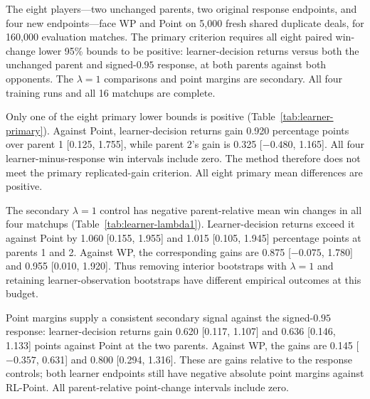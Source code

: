 \documentclass[11pt]{article}
\begin{document}
The eight players---two unchanged parents, two original response endpoints,
and four new endpoints---face WP and Point on 5,000 fresh shared duplicate
deals, for 160,000 evaluation matches. The primary criterion requires all eight
paired win-change lower 95\% bounds to be positive: learner-decision returns
versus both the unchanged parent and signed-$0.95$ response, at both parents
against both opponents. The $\lambda=1$ comparisons and point margins are
secondary. All four training runs and all 16 matchups are complete.

Only one of the eight primary lower bounds is positive
(Table~\ref{tab:learner-primary}). Against Point, learner-decision returns gain
0.920 percentage points over parent 1 [0.125, 1.755], while parent 2's gain is
0.325 [$-0.480$, 1.165]. All four learner-minus-response win intervals include
zero. The method therefore does not meet the primary replicated-gain criterion.
All eight primary mean differences are positive.

\begin{table}[ht]
\centering\small

\caption{Learner-decision returns: primary paired win-score changes in percentage
points, with 95\% intervals, on 5,000 fresh shared development deals.}
\label{tab:learner-primary}
\end{table}

The secondary $\lambda=1$ control has negative parent-relative mean win changes
in all four matchups (Table~\ref{tab:learner-lambda1}). Learner-decision returns
exceed it against Point by 1.060 [0.155, 1.955] and 1.015 [0.105, 1.945]
percentage points at parents 1 and 2. Against WP, the corresponding gains are
0.875 [$-0.075$, 1.780] and 0.955 [0.010, 1.920]. Thus removing interior
bootstraps with $\lambda=1$ and retaining learner-observation bootstraps have
different empirical outcomes at this budget.

\begin{table}[ht]
\centering\small

\caption{Secondary return comparison on the same deals. Each cell gives a
paired win-score change in percentage points and its 95\% interval.}
\label{tab:learner-lambda1}
\end{table}

Point margins supply a consistent secondary signal against the signed-$0.95$
response: learner-decision returns gain 0.620 [0.117, 1.107] and
0.636 [0.146, 1.133] points against Point at the two parents. Against WP, the
gains are 0.145 [$-0.357$, 0.631] and 0.800 [0.294, 1.316]. These are gains
relative to the response controls; both learner endpoints still have negative
absolute point margins against RL-Point. All parent-relative point-change
intervals include zero.
\end{document}
